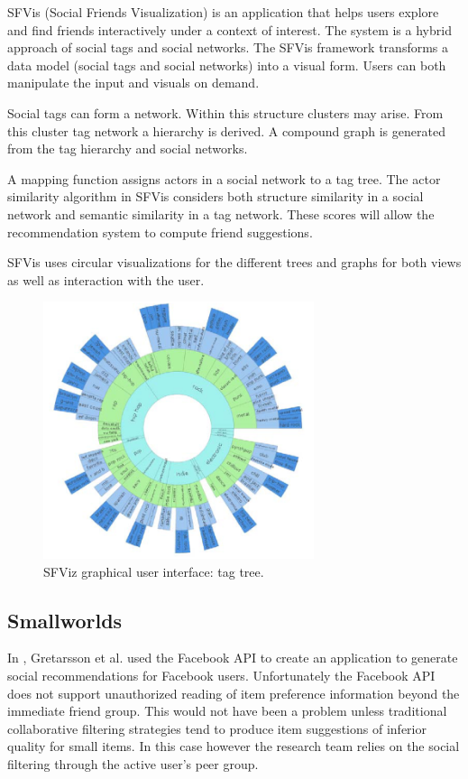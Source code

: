 SFVis (Social Friends Visualization) is an application that helps users explore and find friends interactively under a context of interest. The system is a hybrid approach of social tags and social networks. The SFVis framework transforms a data model (social tags and social networks) into a visual form. Users can both manipulate the input and visuals on demand.

Social tags can form a network. Within this structure clusters may arise. From this cluster tag network a hierarchy is derived. A compound graph is generated from the tag hierarchy and social networks.

A mapping function assigns actors in a social network to a tag tree. The actor similarity algorithm in SFVis considers both structure similarity in a social network and semantic similarity in a tag network. These scores will allow the recommendation system to compute friend suggestions.

SFVis uses circular visualizations for the different trees and graphs for both views as well as interaction with the user.

\begin{figure}%
	\begin{center}
		\includegraphics[width=300px]{img/sfviz_tagtree}%
	\end{center}
	\caption{SFViz graphical user interface: tag tree.}%
	\label{figure:sfviz}%
\end{figure}



\subsection{Smallworlds}\label{chapter:survey:section:applications:subsection:smallwords}

In \cite{gretarsson:2010}, Gretarsson et al. used the Facebook API to create an application to generate social recommendations for Facebook users. Unfortunately the Facebook API does not support unauthorized reading of item preference information beyond the immediate friend group. This would not have been a problem unless traditional collaborative filtering strategies tend to produce item suggestions of inferior quality for small items. In this case however the research team relies on the social filtering through the active user's peer group\cite{gretarsson:2010}.


